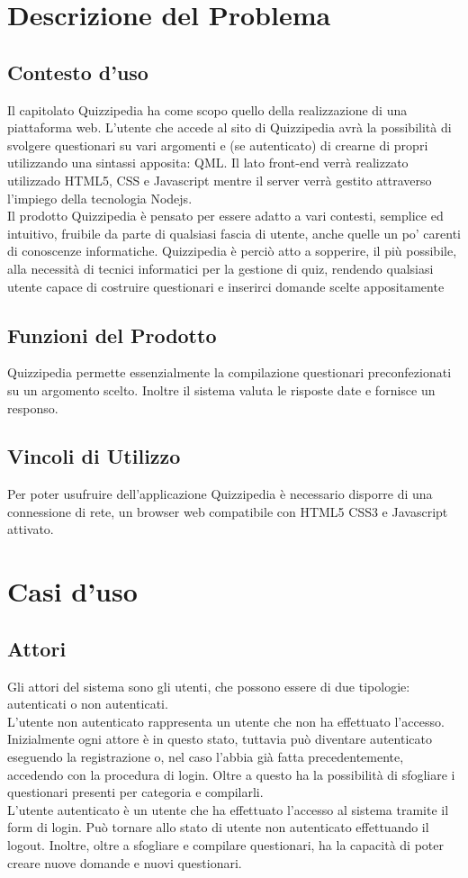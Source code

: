 \documentclass[a4paper,11pt]{article}
\begin{document}
	\newpage	
	\section{Descrizione del Problema}
	\subsection{Contesto d'uso}
		Il capitolato Quizzipedia ha come scopo quello della realizzazione di una piattaforma web. L'utente che accede al sito di Quizzipedia avrà la possibilità di svolgere questionari su vari argomenti e (se autenticato) di crearne di propri utilizzando una sintassi apposita: QML. Il lato front-end verrà realizzato utilizzado HTML5, CSS e Javascript mentre il server verrà gestito attraverso l'impiego della tecnologia Nodejs.\\
		Il prodotto Quizzipedia è pensato per essere adatto a vari contesti, semplice ed intuitivo, fruibile da parte di qualsiasi fascia di utente, anche quelle un po' carenti di conoscenze informatiche. Quizzipedia è perciò atto a sopperire, il più possibile, alla necessità di tecnici informatici per la gestione di quiz, rendendo qualsiasi utente capace di costruire questionari e inserirci domande scelte appositamente
	\subsection{Funzioni del Prodotto}
		Quizzipedia permette essenzialmente la compilazione questionari preconfezionati su un argomento scelto. Inoltre il sistema valuta le risposte date e fornisce un responso.
	\subsection{Vincoli di Utilizzo}
		Per poter usufruire dell'applicazione Quizzipedia è necessario disporre di una connessione di
rete, un browser web compatibile con HTML5 CSS3 e Javascript attivato.
	
	\newpage
	\section{Casi d'uso}
\subsection{Attori}
Gli attori del sistema sono gli utenti, che possono essere di due tipologie: autenticati o non autenticati.\\ 
L'utente non autenticato rappresenta un utente che non ha effettuato l'accesso. Inizialmente ogni attore è in questo stato, tuttavia può diventare autenticato eseguendo la registrazione o, nel caso l'abbia già fatta precedentemente, accedendo con la procedura di login. Oltre a questo ha la possibilità di  sfogliare i questionari presenti per categoria e compilarli.\\
L'utente autenticato è un utente che ha effettuato l'accesso al sistema tramite il form di login. Può tornare allo stato di utente non autenticato effettuando il logout. Inoltre, oltre a sfogliare e compilare questionari, ha la capacità di poter creare nuove domande e nuovi questionari.\\
\end{document}
